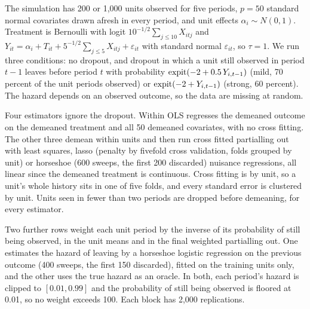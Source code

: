 The simulation has 200 or 1,000 units observed for five periods, $p = 50$ standard normal covariates drawn afresh in every period, and unit effects $\alpha_i \sim N(0,1)$. Treatment is Bernoulli with logit $10^{-1/2}\sum_{j\leq 10}X_{itj}$ and $Y_{it} = \alpha_i + T_{it} + 5^{-1/2}\sum_{j\leq 5}X_{itj} + \varepsilon_{it}$ with standard normal $\varepsilon_{it}$, so $\tau = 1$. We run three conditions: no dropout, and dropout in which a unit still observed in period $t - 1$ leaves before period $t$ with probability $\operatorname{expit}(-2 + 0.5\,Y_{i,t-1})$ (mild, 70 percent of the unit periods observed) or $\operatorname{expit}(-2 + Y_{i,t-1})$ (strong, 60 percent). The hazard depends on an observed outcome, so the data are missing at random.

Four estimators ignore the dropout. Within OLS regresses the demeaned outcome on the demeaned treatment and all 50 demeaned covariates, with no cross fitting. The other three demean within units and then run cross fitted partialling out with least squares, lasso (penalty by fivefold cross validation, folds grouped by unit) or horseshoe (600 sweeps, the first 200 discarded) nuisance regressions, all linear since the demeaned treatment is continuous. Cross fitting is by unit, so a unit's whole history sits in one of five folds, and every standard error is clustered by unit. Units seen in fewer than two periods are dropped before demeaning, for every estimator.

Two further rows weight each unit period by the inverse of its probability of still being observed, in the unit means and in the final weighted partialling out. One estimates the hazard of leaving by a horseshoe logistic regression on the previous outcome (400 sweeps, the first 150 discarded), fitted on the training units only, and the other uses the true hazard as an oracle. In both, each period's hazard is clipped to $[0.01, 0.99]$ and the probability of still being observed is floored at 0.01, so no weight exceeds 100. Each block has 2,000 replications.

